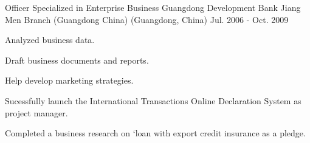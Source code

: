 \documentclass[11pt, a4paper]{awesome-cv} %
\begin{document}
\begin{cventries}
		
	\cventry
	{Officer Specialized in Enterprise Business} %
	{Guangdong Development Bank Jiang Men Branch (Guangdong China)} %
	{(Guangdong, China)} %
	{Jul. 2006 - Oct. 2009} %
	{ %
		\begin{cvitems}
				\item {Analyzed business data.}
				\item {Draft business documents and reports.}
				\item {Help develop marketing strategies.}
				\item {Sucessfully launch the International Transactions Online Declaration System as project manager.}
				\item {Completed a business research on ‘loan with export credit insurance as a pledge.}
		\end{cvitems}
	}
		
		
		
	
	
\end{cventries}

%

\end{document}

